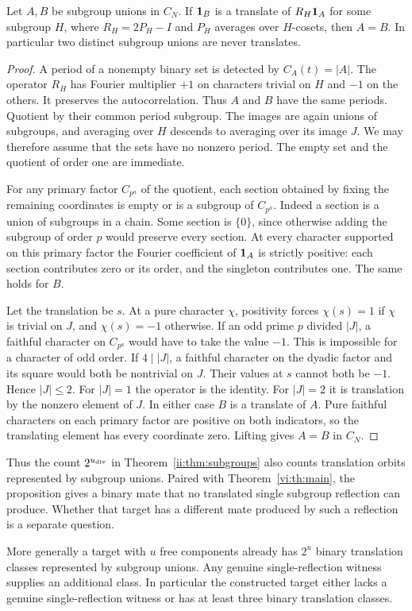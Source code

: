 \begin{proposition}\label{bridge:separation}
Let $A,B$ be subgroup unions in $C_N$. If $\mathbf1_B$ is a translate of $R_H\mathbf1_A$ for some subgroup $H$, where $R_H=2P_H-I$ and $P_H$ averages over $H$-cosets, then $A=B$. In particular two distinct subgroup unions are never translates.
\end{proposition}
\begin{proof}
A period of a nonempty binary set is detected by $C_A(t)=|A|$. The operator $R_H$ has Fourier multiplier $+1$ on characters trivial on $H$ and $-1$ on the others. It preserves the autocorrelation. Thus $A$ and $B$ have the same periods. Quotient by their common period subgroup. The images are again unions of subgroups, and averaging over $H$ descends to averaging over its image $J$. We may therefore assume that the sets have no nonzero period. The empty set and the quotient of order one are immediate.

For any primary factor $C_{p^a}$ of the quotient, each section obtained by fixing the remaining coordinates is empty or is a subgroup of $C_{p^a}$. Indeed a section is a union of subgroups in a chain. Some section is $\{0\}$, since otherwise adding the subgroup of order $p$ would preserve every section. At every character supported on this primary factor the Fourier coefficient of $\mathbf1_A$ is strictly positive: each section contributes zero or its order, and the singleton contributes one. The same holds for $B$.

Let the translation be $s$. At a pure character $\chi$, positivity forces $\chi(s)=1$ if $\chi$ is trivial on $J$, and $\chi(s)=-1$ otherwise. If an odd prime $p$ divided $|J|$, a faithful character on $C_{p^a}$ would have to take the value $-1$. This is impossible for a character of odd order. If $4\mid |J|$, a faithful character on the dyadic factor and its square would both be nontrivial on $J$. Their values at $s$ cannot both be $-1$. Hence $|J|\le2$. For $|J|=1$ the operator is the identity. For $|J|=2$ it is translation by the nonzero element of $J$. In either case $B$ is a translate of $A$. Pure faithful characters on each primary factor are positive on both indicators, so the translating element has every coordinate zero. Lifting gives $A=B$ in $C_N$.
\end{proof}
Thus the count $2^{u_{\rm div}}$ in Theorem~\ref{ii:thm:subgroups} also counts translation orbits represented by subgroup unions. Paired with Theorem~\ref{vi:th:main}, the proposition gives a binary mate that no translated single subgroup reflection can produce. Whether that target has a different mate produced by such a reflection is a separate question.

More generally a target with $u$ free components already has $2^u$ binary translation classes represented by subgroup unions. Any genuine single-reflection witness supplies an additional class. In particular the constructed target either lacks a genuine single-reflection witness or has at least three binary translation classes.

